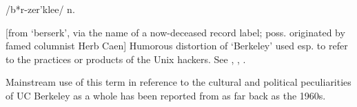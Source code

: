  /b*r-zer'klee/ n.

[from `berserk', via the name of a now-deceased record label; poss. originated
by famed columnist Herb Caen] Humorous distortion of `Berkeley' used esp. to
refer to the practices or products of the  Unix hackers. See
, , .

Mainstream use of this term in reference to the cultural and political
peculiarities of UC Berkeley as a whole has been reported from as far back as
the 1960s.

